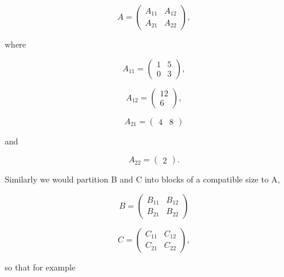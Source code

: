 \begin{equation}
A =
\left (
\begin{array}{cc}
A_{11} & A_{12} \\
A_{21} & A_{22}
\end{array}
\right ) ,
\end{equation}

where

\begin{equation}
A_{11} =
\left (
\begin{array}{cc}
1 & 5 \\
0 & 3
\end{array}
\right )  ,
\end{equation}

\begin{equation}
A_{12} =
\left (
\begin{array}{cc}
12 \\
6 
\end{array}
\right ),
\end{equation}

\begin{equation}
A_{21} =
\left (
\begin{array}{cc}
4 & 8 
\end{array}
\right )  
\end{equation}

and

\begin{equation}
A_{22} =
\left (
\begin{array}{c}
2
\end{array}
\right ).
\end{equation}

Similarly we would partition B and C into blocks of a compatible size to A,

\begin{equation}
B =
\left (
\begin{array}{cc}
B_{11} & B_{12} \\
B_{21} & B_{22}
\end{array}
\right )
\end{equation}

\begin{equation}
C =
\left (
\begin{array}{cc}
C_{11} & C_{12} \\
C_{21} & C_{22}
\end{array}
\right ) ,
\end{equation}

so that for example

